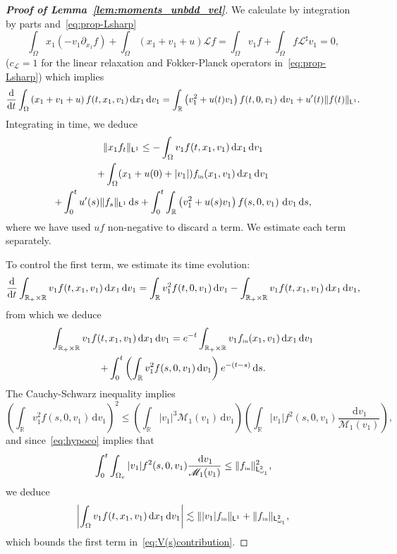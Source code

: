 \documentclass[11pt]{amsart}
\theoremstyle{definition}
\theoremstyle{remark}
\numberwithin{equation}{section}
\newcommand\R{{\mathbb R}}
\def\LL{{\mathcal L}}
\def\MMM{{\mathscr M}}
\newcommand{\dd}{{\, \mathrm d}}
\newcommand{\dt}{\frac{{\rm d}}{{\rm d}t}}
\newcommand{\init}{\text{{\tiny {\rm in}}}}
\newcommand{\sfL}{\mathsf{L}}
\begin{document}
\begin{proof}[{\bf Proof of Lemma~\ref{lem:moments_unbdd_vel}}]
  We calculate by integration by parts and~\eqref{eq:prop-Lsharp}
  \begin{equation*}
    \int_\Omega x_1 (- v_1 \partial_{x_1} f )+ \int_\Omega (x_1+v_1+u)  \mathcal Lf =  \int_\Omega v_1  f + \int_\Omega f  \mathcal \LL^\sharp v_1 = 0,
  \end{equation*}
($c_\LL=1$ for the linear relaxation and Fokker-Planck operators in~\eqref{eq:prop-Lsharp}) which implies
  \begin{equation*}
    \dt \int_\Omega \left(x_1 + v_1 + u\right) f(t,x_1,v_1) \dd x_1 \dd v_1 = \int_{\R} \left( v_1^2 + u(t) v_1\right)   f(t,0,v_1) \,   \dd v_1 + u'(t) \| f(t) \|_{\sfL^{1}}.
  \end{equation*}
  Integrating in time, we deduce
  \begin{multline} \label{eq:V(s)contribution}
    \| x_1 f_t \|_{\sfL^{1}} \le - \int_\Omega v_1 f(t,x_1,v_1) \dd x_1 \dd v_1 \\ + \int_\Omega (x_1  + u(0) + |v_1|) f_\init(x_1,v_1) \dd x_1 \dd v_1
    \\
    + \int_0^t   u'(s) \| f_s \|_{\sfL^1} \dd s + 
    \int_0^t \int_{\R} \left( v_1^2 + u(s) v_1 \right) f(s,0,v_1) \,    \dd v_1 \dd s,
  \end{multline}
  where we have used $uf$ non-negative to discard a term. We estimate each term separately.

  To control the first term, we estimate its time evolution:
  \begin{align*}
    \dt \int_{\R_+ \times \R} v_1 f(t,x_1,v_1) \dd x_1 \dd v_1 = \int_{\R} v_1^2 f(t,0,v_1) \dd v_1 - \int_{\R_+ \times \R} v_1 f(t,x_1,v_1) \dd x_1 \dd v_1,
  \end{align*}
  from which we deduce
  \begin{multline*}
    \int_{\R_+ \times \R} v_1 f(t,x_1,v_1) \dd x_1 \dd v_1 = e^{-t} \int_{\R_+\times \R} v_1 f_\init(x_1,v_1) \dd x_1 \dd v_1 \\
    + \int_0^t \left( \int_{\R} v_1^2 f(s,0,v_1) \dd v_1 \right) e^{-(t-s)} \dd s.
  \end{multline*}
  The Cauchy-Schwarz inequality implies
  \begin{equation*}
    \left( \int_{\R} v_1^2 f(s,0,v_1) \dd v_1 \right)^2 \leq \left( \int_{\R} |v_1|^3 \MMM_1(v_1) \dd v_1 \right) \left( \int_{\R} \vert v_1 \vert f^2(s,0,v_1)\frac{\dd v_1}{\MMM_1(v_1)} \right) ,
  \end{equation*}
  and since~\eqref{eq:hypoco} implies that
  \begin{equation*}
    \int_0^t \int_{\Omega_v} \vert v_1 \vert f^2(s,0,v_1)\frac{\dd v_1}{\MMM_1(v_1)} \le \| f_\init \|_{\sfL^{2}_{\omega_1}}^2,
  \end{equation*}
  we deduce
  \begin{equation}
    \label{eq:mmt-bd-1}
    \left| \int_{\Omega} v_1 f(t,x_1,v_1) \dd x_1 \dd v_1 \right| \lesssim \| |v_1| f_\init \|_{\sfL^{1}} +  \| f_\init \|_{\sfL^{2}_{\omega_1}},
  \end{equation}
  which bounds the first term in~\eqref{eq:V(s)contribution}.


\end{proof}
\end{document}
